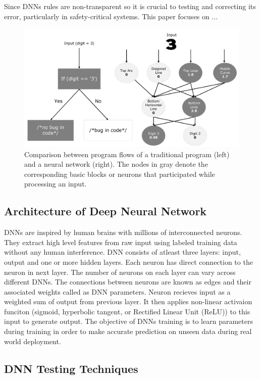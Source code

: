 \documentclass[10pt, conference, a4paper, final]{IEEEtran}
\begin{document}
Since DNNs rules are non-transparent so it is crucial to testing and correcting its error, particularly in safety-critical systems. This paper focuses on ...

\begin{figure}{}
    \centering
    \includegraphics[width=\linewidth]{paper_images/traditional and DNN.pdf}
    \caption{ Comparison between program flows of a traditional program (left) and a neural network (right). The nodes in gray denote the corresponding basic blocks or neurons that participated while processing an input.}
    \label{fig:graph}
\end{figure} 
\subsection{Architecture of Deep Neural Network}

DNNs are inspired by human brains with millions of interconnected neurons. They extract high level features from raw input using labeled training data without any human interference. DNN consists of atleast three layers: input, output and one or more hidden layers. Each neuron has direct connection to the neuron in next layer. The number of neurons on each layer can vary across different DNNs. The connections between neurons are known as edges and their associated weights called as DNN parameters. Neuron recieves input as a weighted sum of output from previous layer. It then applies non-linear activaion funciton (sigmoid, hyperbolic tangent, or Rectified Linear Unit (ReLU)) to this input to generate output. The objective of DNNs training is to learn parameters during training in order to make accurate prediction on unseen data during real world deployment.


\subsection {DNN Testing Techniques}
\end{document}
